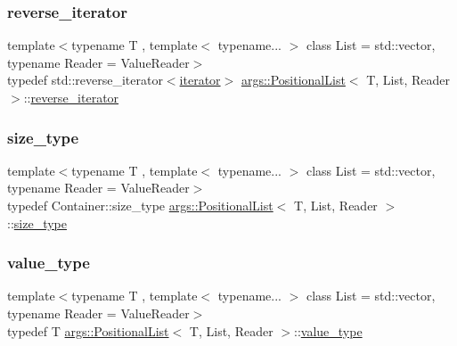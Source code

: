 \subsubsection{\texorpdfstring{reverse\+\_\+iterator}{reverse\_iterator}}
{\footnotesize\ttfamily template$<$typename T , template$<$ typename... $>$ class List = std\+::vector, typename Reader  = Value\+Reader$>$ \\
typedef std\+::reverse\+\_\+iterator$<$\hyperlink{classargs_1_1_positional_list_ad0833c77245d7bc7678de4896d8443da}{iterator}$>$ \hyperlink{classargs_1_1_positional_list}{args\+::\+Positional\+List}$<$ T, List, Reader $>$\+::\hyperlink{classargs_1_1_positional_list_ab279be9deebae66a8084ba49d532cace}{reverse\+\_\+iterator}}

\mbox{\label{classargs_1_1_positional_list_a5e44ceec70dbb63870a9ff1002379002}} 
\subsubsection{\texorpdfstring{size\+\_\+type}{size\_type}}
{\footnotesize\ttfamily template$<$typename T , template$<$ typename... $>$ class List = std\+::vector, typename Reader  = Value\+Reader$>$ \\
typedef Container\+::size\+\_\+type \hyperlink{classargs_1_1_positional_list}{args\+::\+Positional\+List}$<$ T, List, Reader $>$\+::\hyperlink{classargs_1_1_positional_list_a5e44ceec70dbb63870a9ff1002379002}{size\+\_\+type}}

\mbox{\label{classargs_1_1_positional_list_a85c1f957ee4466f0668e673a2c5abbcd}} 
\subsubsection{\texorpdfstring{value\+\_\+type}{value\_type}}
{\footnotesize\ttfamily template$<$typename T , template$<$ typename... $>$ class List = std\+::vector, typename Reader  = Value\+Reader$>$ \\
typedef T \hyperlink{classargs_1_1_positional_list}{args\+::\+Positional\+List}$<$ T, List, Reader $>$\+::\hyperlink{classargs_1_1_positional_list_a85c1f957ee4466f0668e673a2c5abbcd}{value\+\_\+type}}



